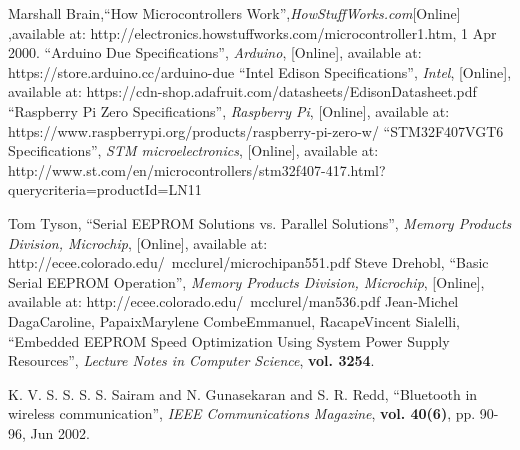 \begin{thebibliography}{5}
 Marshall Brain,``How Microcontrollers Work'',\emph{HowStuffWorks.com}[Online] ,available at: http://electronics.howstuffworks.com/microcontroller1.htm, 1 Apr 2000.
 ``Arduino Due Specifications'', \emph{Arduino}, [Online], available at: https://store.arduino.cc/arduino-due
 ``Intel Edison Specifications'', \emph{Intel}, [Online], available at: https://cdn-shop.adafruit.com/datasheets/EdisonDatasheet.pdf
 ``Raspberry Pi Zero Specifications'', \emph{Raspberry Pi}, [Online], available at: https://www.raspberrypi.org/products/raspberry-pi-zero-w/
 ``STM32F407VGT6 Specifications'', \emph{STM microelectronics}, [Online], available at: http://www.st.com/en/microcontrollers/stm32f407-417.html?querycriteria=productId=LN11

 Tom Tyson, ``Serial EEPROM Solutions vs. Parallel Solutions'', \emph{Memory Products Division, Microchip}, [Online], available at: http://ecee.colorado.edu/~mcclurel/microchipan551.pdf
 Steve Drehobl, ``Basic Serial EEPROM Operation'', \emph{Memory Products Division, Microchip}, [Online], available at: http://ecee.colorado.edu/~mcclurel/man536.pdf
 Jean-Michel DagaCaroline, PapaixMarylene CombeEmmanuel, RacapeVincent Sialelli, ``Embedded EEPROM Speed Optimization Using System Power Supply Resources'', \emph{Lecture Notes in Computer Science}, \textbf{vol. 3254}. 

 K. V. S. S. S. S. Sairam and N. Gunasekaran and S. R. Redd, ``Bluetooth in wireless communication'', \emph{IEEE Communications Magazine}, \textbf{vol. 40(6)}, pp. 90-96, Jun 2002. 


\end{thebibliography}
